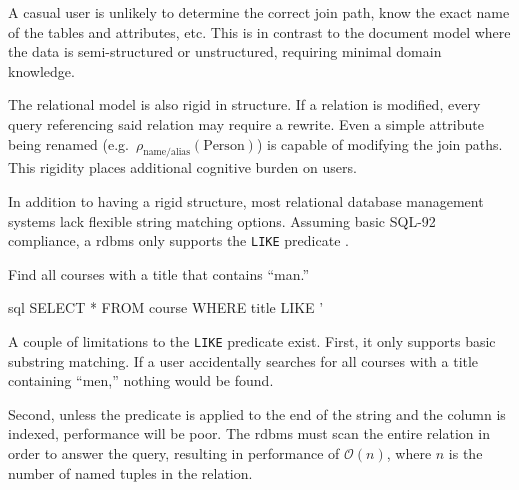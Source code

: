 			A casual user is unlikely to determine the correct join path, know the exact name of the tables and attributes, etc.  This is in contrast to the document model where the data is semi-structured or unstructured, requiring minimal domain knowledge.

			The relational model is also rigid in structure.  If a relation is modified, every query referencing said relation may require a rewrite.  Even a simple attribute being renamed (e.g.~\(\rho_{\text{name/alias}}(\text{Person})\)) is capable of modifying the join paths.  This rigidity places additional cognitive burden on users.
			
			In addition to having a rigid structure, most relational database management systems lack flexible string matching options.	 Assuming basic SQL-92 compliance, a \gls{rdbms} only supports the \texttt{LIKE} predicate \cite{sql-11}.
			
			\begin{ex}
				Find all courses with a title that contains ``man.''
				
				\begin{singlespaced}
					\begin{pygments}{sql}
SELECT *
FROM   course
WHERE  title LIKE '%
					\end{pygments}
				\end{singlespaced}
			\end{ex}
			
			A couple of limitations to the \texttt{LIKE} predicate exist.  First, it only supports basic substring matching.  If a user accidentally searches for all courses with a title containing ``men,'' nothing would be found.
			
			Second, unless the predicate is applied to the end of the string and the column is indexed, performance will be poor.  The \gls{rdbms} must scan the entire relation in order to answer the query, resulting in performance of \(\mathcal{O}(n)\), where \(n\) is the number of named tuples in the relation.